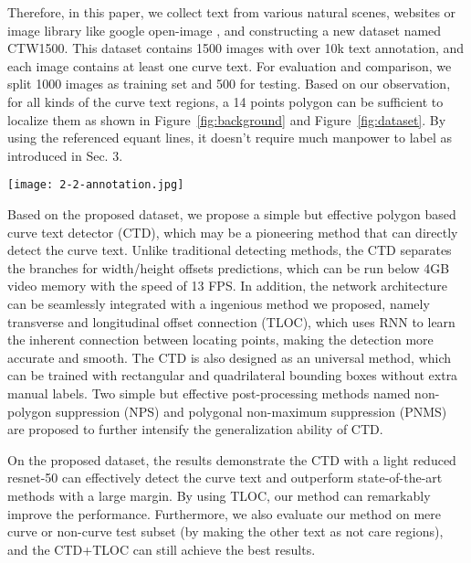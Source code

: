 \documentclass[10pt,twocolumn,letterpaper]{article}
\begin{document}
Therefore, in this paper, we collect text from various natural scenes, websites or image library like google open-image \cite{openimages}, and constructing a new dataset named CTW1500. This dataset contains 1500 images with over 10k text annotation, and each image contains at least one curve text. For evaluation and comparison, we split 1000 images as training set and 500 for testing.
Based on our observation, for all kinds of the curve text regions, a 14 points polygon can be sufficient to localize them as shown in Figure~\ref{fig:background} and Figure~\ref{fig:dataset}. By using the referenced equant lines, it doesn't require much manpower to label as introduced in Sec. 3.
\begin{figure*}[htb]
  \centering
  \centerline{\texttt{[image: 2-2-annotation.jpg]}}
  \caption{Examples curve text annotations of CTW1500 dataset.}\label{fig:dataset}
\end{figure*}

Based on the proposed dataset, we propose a simple but effective polygon based curve text detector (CTD), which may be a pioneering method that can directly detect the curve text. Unlike traditional detecting methods, the CTD separates the branches for width/height offsets predictions, which can be run below 4GB video memory with the speed of 13 FPS. In addition, the network architecture can be seamlessly integrated with a ingenious method we proposed, namely transverse and longitudinal offset connection (TLOC), which uses RNN to learn the inherent connection between locating points, making the detection more accurate and smooth. The CTD is also designed as an universal method, which can be trained with rectangular and quadrilateral bounding boxes without extra manual labels. Two simple but effective post-processing methods named non-polygon suppression (NPS) and polygonal non-maximum suppression (PNMS) are proposed to further intensify the generalization ability of CTD.

On the proposed dataset, the results demonstrate the CTD with a light reduced resnet-50 \cite{he2016deep} can effectively detect the curve text and outperform state-of-the-art methods with a large margin. By using TLOC, our method can remarkably improve the performance. Furthermore, we also evaluate our method on mere curve or non-curve test subset (by making the other text as not care regions), and the CTD+TLOC can still achieve the best results.
\end{document}
